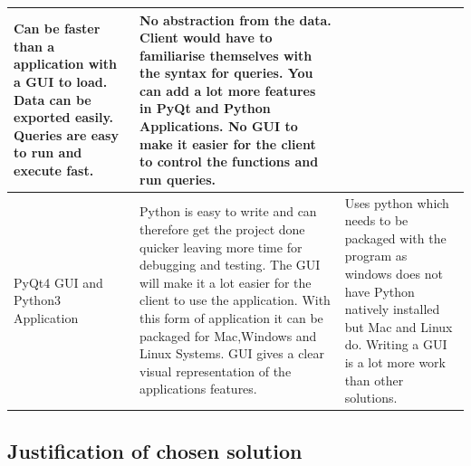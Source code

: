 \begin{flushleft}
\begin{longtable}{|p{3cm}|p{4cm}|p{4cm}|}
Can be faster than a application with a GUI to load.
Data can be exported easily.
Queries are easy to run and execute fast. &

No abstraction from the data.
Client would have to familiarise themselves with the syntax for queries.
You can add a lot more features in PyQt and Python Applications.
No GUI to make it easier for the client to control the functions and run queries. 

\\ \hline

PyQt4 GUI and Python3 Application &

Python is easy to write and can therefore get the project done quicker leaving more time for debugging and testing.
The GUI will make it a lot easier for the client to use the application.
With this form of application it can be packaged for Mac,Windows and Linux Systems.
GUI gives a clear visual representation of the applications features. &

Uses python which needs to be packaged with the program as windows does not have Python natively installed but Mac and Linux do.
Writing a GUI is a lot more work than other solutions. 

\\ \hline

\end{longtable}
\label{tab:Alternative Solutions to the problem}
\end{flushleft}


\pagebreak
\subsection{Justification of chosen solution}

